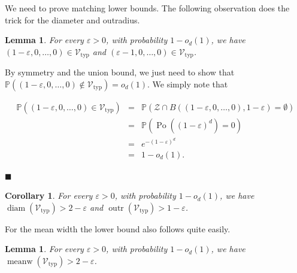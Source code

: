 \documentclass[11pt]{article}%
\newenvironment{proof}{\vspace{1ex}\noindent{\bf Proof.}}{\hspace*{\fill}$\blacksquare$\vspace{1ex}}
\newtheorem{lemma} [theorem] {Lemma}%
\newtheorem{corollary} [theorem] {Corollary}%
\newcommand{\Vcal}[0]{\ensuremath{{\mathcal V}}}
\newcommand{\Zcal}[0]{\ensuremath{{\mathcal Z}}}
\newcommand{\Pee}[0]{\ensuremath{{\mathbb P}}}
\newcommand{\eps}{\varepsilon}
\DeclareMathOperator{\diam}{diam}
\DeclareMathOperator{\Po}{Po}
\DeclareMathOperator{\outr}{outr}
\DeclareMathOperator{\meanw}{meanw}
\newcommand{\Vtyp}[0]{\Vcal_{\text{typ}}}
\begin{document}
We need to prove matching lower bounds.
The following observation does the trick for the diameter and outradius.

\begin{lemma}\label{lem:2pts}
For every $\eps>0$, with probability $1-o_d(1)$, we have 
$(1-\eps,0,\dots,0) \in \Vtyp$ and $(\eps-1,0,\dots,0) \in \Vtyp$.
\end{lemma}

\begin{proof}
By symmetry and the union bound, we just need to show that 
$\Pee( (1-\eps,0,\dots,0) \not\in \Vtyp ) = o_d(1)$.
We simply note that 

$$ \begin{array}{rcl} 
\Pee\left( (1-\eps,0,\dots,0) \in \Vtyp\right) & = &  
\Pee( \Zcal \cap B( (1-\eps,0,\dots,0), 1-\eps) = \emptyset ) \\
& = & \Pee( \Po( (1-\eps)^d ) = 0 ) \\
& = & e^{-(1-\eps)^d } \\
& = & 1-o_d(1). 
\end{array} $$

\end{proof}

\begin{corollary}
For every $\eps>0$, with probability $1-o_d(1)$, we have $\diam(\Vtyp) > 2-\eps$ and $\outr(\Vtyp) > 1-\eps$.
\end{corollary}

For the mean width the lower bound also follows quite easily.

\begin{lemma}\label{lem:meanwlb}
 For every $\eps>0$, with probability $1-o_d(1)$, we have 
 $\meanw(\Vtyp) > 2-\eps$.
\end{lemma}
\end{document}

